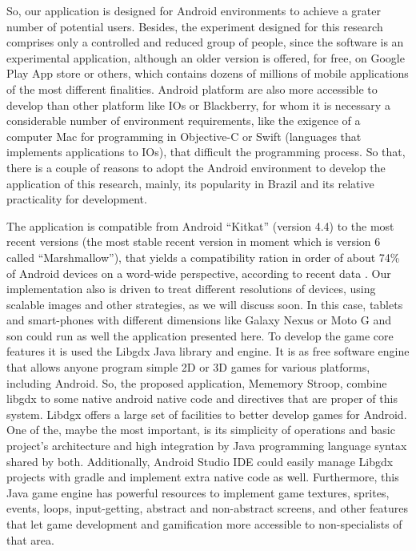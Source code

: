 So, our application is designed for Android environments to achieve a grater number of potential users. Besides, the experiment designed for this research comprises only a controlled and reduced group of people, since the software is an experimental application, although an older version is offered, for free, on Google Play App store or others, which contains dozens of millions of mobile applications of the most different finalities. Android platform are also more accessible to develop than other platform like IOs or Blackberry, for whom it is necessary a considerable number of environment requirements, like the exigence of a computer Mac for programming in Objective-C or Swift (languages that implements applications to IOs), that difficult the programming process. So that, there is a couple of reasons to adopt the Android environment to develop the application of this research, mainly, its popularity in Brazil and its relative practicality for development. 
		
The application is compatible from Android ``Kitkat'' (version 4.4) to the most recent versions (the most stable recent version in moment which is version 6 called ``Marshmallow''), that yields a compatibility ration in order of about 74\% of Android devices on a word-wide perspective, according to recent data \citep{android-official}. Our implementation also is driven to treat different resolutions of devices, using scalable images and other strategies, as we will discuss soon. In this case, tablets and smart-phones with different dimensions like Galaxy Nexus or Moto G and son could run as well the application presented here. To develop the game core features it is used the Libgdx Java library and engine. It is as free software engine that allows anyone program simple 2D or 3D games for various platforms, including Android. So, the proposed application, Mememory Stroop, combine libgdx to some native android native code and directives that are proper of this system. Libdgx offers a large set of facilities to better develop games for Android. One of the, maybe the most important, is its simplicity of operations and basic project's architecture and high integration by Java programming language syntax shared by both. Additionally, Android Studio IDE could easily manage Libgdx projects with gradle and implement extra native code as well. Furthermore, this Java game engine has powerful resources to implement game textures, sprites, events, loops, input-getting, abstract and non-abstract screens, and other features that let game development and gamification more accessible to non-specialists of that area.
		
